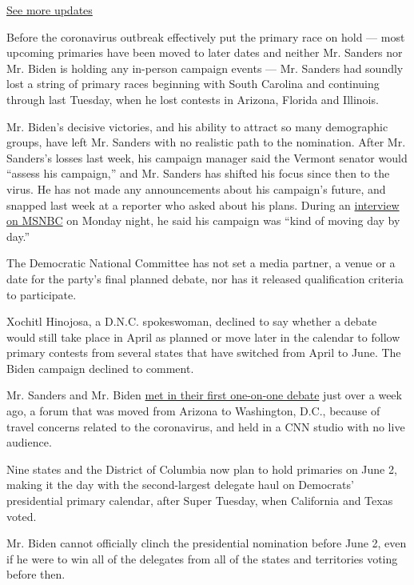 \href{https://www.nytimes.com/2020/07/31/us/elections/biden-vs-trump.html?action=click\&pgtype=Article\&state=default\&region=MAIN_CONTENT_1\&context=storylines_live_updates}{See
more updates}

Before the coronavirus outbreak effectively put the primary race on hold
--- most upcoming primaries have been moved to later dates and neither
Mr. Sanders nor Mr. Biden is holding any in-person campaign events ---
Mr. Sanders had soundly lost a string of primary races beginning with
South Carolina and continuing through last Tuesday, when he lost
contests in Arizona, Florida and Illinois.

Mr. Biden's decisive victories, and his ability to attract so many
demographic groups, have left Mr. Sanders with no realistic path to the
nomination. After Mr. Sanders's losses last week, his campaign manager
said the Vermont senator would ``assess his campaign,'' and Mr. Sanders
has shifted his focus since then to the virus. He has not made any
announcements about his campaign's future, and snapped last week at a
reporter who asked about his plans. During an
\href{https://www.youtube.com/watch?v=pKxArKJMU4c}{interview on MSNBC}
on Monday night, he said his campaign was ``kind of moving day by day.''

The Democratic National Committee has not set a media partner, a venue
or a date for the party's final planned debate, nor has it released
qualification criteria to participate.

Xochitl Hinojosa, a D.N.C. spokeswoman, declined to say whether a debate
would still take place in April as planned or move later in the calendar
to follow primary contests from several states that have switched from
April to June. The Biden campaign declined to comment.

Mr. Sanders and Mr. Biden
\href{https://www.nytimes.com/2020/03/15/us/politics/biden-sanders-debate-recap.html}{met
in their first one-on-one debate} just over a week ago, a forum that was
moved from Arizona to Washington, D.C., because of travel concerns
related to the coronavirus, and held in a CNN studio with no live
audience.

Nine states and the District of Columbia now plan to hold primaries on
June 2, making it the day with the second-largest delegate haul on
Democrats' presidential primary calendar, after Super Tuesday, when
California and Texas voted.

Mr. Biden cannot officially clinch the presidential nomination before
June 2, even if he were to win all of the delegates from all of the
states and territories voting before then.

